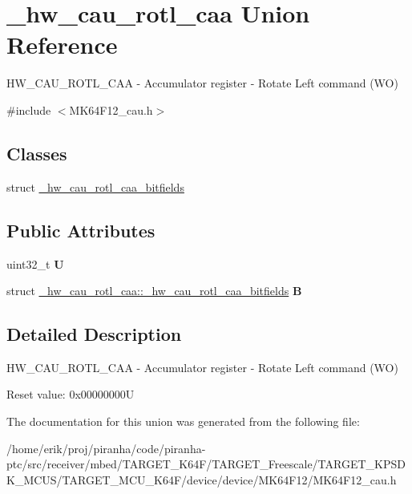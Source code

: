 \hypertarget{union__hw__cau__rotl__caa}{}\section{\+\_\+hw\+\_\+cau\+\_\+rotl\+\_\+caa Union Reference}
\label{union__hw__cau__rotl__caa}


H\+W\+\_\+\+C\+A\+U\+\_\+\+R\+O\+T\+L\+\_\+\+C\+AA -\/ Accumulator register -\/ Rotate Left command (WO)  




{\ttfamily \#include $<$M\+K64\+F12\+\_\+cau.\+h$>$}

\subsection*{Classes}
\begin{DoxyCompactItemize}
\item 
struct \hyperlink{struct__hw__cau__rotl__caa_1_1__hw__cau__rotl__caa__bitfields}{\+\_\+hw\+\_\+cau\+\_\+rotl\+\_\+caa\+\_\+bitfields}
\end{DoxyCompactItemize}
\subsection*{Public Attributes}
\begin{DoxyCompactItemize}
\item 
uint32\+\_\+t {\bfseries U}\hypertarget{union__hw__cau__rotl__caa_a1838e9ef5d24b49a4dd61e2c607b9a5f}{}\label{union__hw__cau__rotl__caa_a1838e9ef5d24b49a4dd61e2c607b9a5f}

\item 
struct \hyperlink{struct__hw__cau__rotl__caa_1_1__hw__cau__rotl__caa__bitfields}{\+\_\+hw\+\_\+cau\+\_\+rotl\+\_\+caa\+::\+\_\+hw\+\_\+cau\+\_\+rotl\+\_\+caa\+\_\+bitfields} {\bfseries B}\hypertarget{union__hw__cau__rotl__caa_a118a2cab444120d0fec7eed078642929}{}\label{union__hw__cau__rotl__caa_a118a2cab444120d0fec7eed078642929}

\end{DoxyCompactItemize}


\subsection{Detailed Description}
H\+W\+\_\+\+C\+A\+U\+\_\+\+R\+O\+T\+L\+\_\+\+C\+AA -\/ Accumulator register -\/ Rotate Left command (WO) 

Reset value\+: 0x00000000U 

The documentation for this union was generated from the following file\+:\begin{DoxyCompactItemize}
\item 
/home/erik/proj/piranha/code/piranha-\/ptc/src/receiver/mbed/\+T\+A\+R\+G\+E\+T\+\_\+\+K64\+F/\+T\+A\+R\+G\+E\+T\+\_\+\+Freescale/\+T\+A\+R\+G\+E\+T\+\_\+\+K\+P\+S\+D\+K\+\_\+\+M\+C\+U\+S/\+T\+A\+R\+G\+E\+T\+\_\+\+M\+C\+U\+\_\+\+K64\+F/device/device/\+M\+K64\+F12/M\+K64\+F12\+\_\+cau.\+h\end{DoxyCompactItemize}
